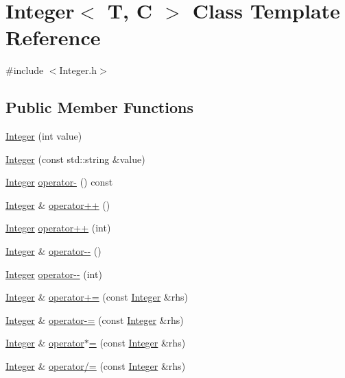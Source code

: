 \hypertarget{classInteger}{\section{Integer$<$ T, C $>$ Class Template Reference}
\label{classInteger}
}


{\ttfamily \#include $<$Integer.\-h$>$}

\subsection*{Public Member Functions}
\begin{DoxyCompactItemize}
\item 
\hyperlink{classInteger_a1d5315e4ec5b56b8cb3a6991d514f7d6}{Integer} (int value)
\item 
\hyperlink{classInteger_afebf72d47413ceedcc30b74c3055b771}{Integer} (const std\-::string \&value)
\item 
\hyperlink{classInteger}{Integer} \hyperlink{classInteger_ae9d1fb575b55ac2f6352a2d735c4bb75}{operator-\/} () const 
\item 
\hyperlink{classInteger}{Integer} \& \hyperlink{classInteger_a3fc47ae07dce44aa72ce9e02b9a3e003}{operator++} ()
\item 
\hyperlink{classInteger}{Integer} \hyperlink{classInteger_a326d5bd7d72ad858f523bed95ae66150}{operator++} (int)
\item 
\hyperlink{classInteger}{Integer} \& \hyperlink{classInteger_ac6227ea2b4a75ff08d537db0d3a26be4}{operator-\/-\/} ()
\item 
\hyperlink{classInteger}{Integer} \hyperlink{classInteger_ae5b697679221dbf1fbc942335bb19fb4}{operator-\/-\/} (int)
\item 
\hyperlink{classInteger}{Integer} \& \hyperlink{classInteger_a0c37e366a26b17cfd73b1b29a1e8b47b}{operator+=} (const \hyperlink{classInteger}{Integer} \&rhs)
\item 
\hyperlink{classInteger}{Integer} \& \hyperlink{classInteger_a2bff1e6dc8f6990028783da8bdd89b0d}{operator-\/=} (const \hyperlink{classInteger}{Integer} \&rhs)
\item 
\hyperlink{classInteger}{Integer} \& \hyperlink{classInteger_acf1388dc4ce49c9b7d69b3b6c3a245f7}{operator$\ast$=} (const \hyperlink{classInteger}{Integer} \&rhs)
\item 
\hyperlink{classInteger}{Integer} \& \hyperlink{classInteger_aa13c715bbc68c58c2bd1f1b49a80277e}{operator/=} (const \hyperlink{classInteger}{Integer} \&rhs)
\item 

\end{DoxyCompactItemize}
